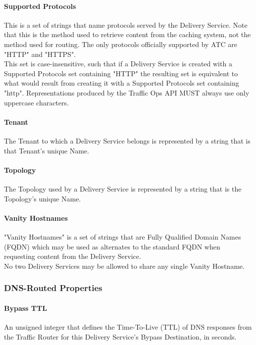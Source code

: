\paragraph{Supported Protocols}
This is a set of strings that name protocols served by the Delivery Service.
Note that this is the method used to retrieve content from the caching system,
not the method used for routing. The only protocols officially supported by ATC
are "HTTP" and "HTTPS".\\
This set is case-insensitive, such that if a Delivery Service is created with a
Supported Protocols set containing "HTTP" the resulting set is equivalent to
what would result from creating it with a Supported Protocols set containing
"http". Representations produced by the Traffic Ops API MUST always use
only uppercase characters.

\paragraph{Tenant}
The Tenant to which a Delivery Service belongs is represented by a string that
is that Tenant's unique Name.

\paragraph{Topology}
The Topology used by a Delivery Service is represented by a string that is the
Topology's unique Name.

\paragraph{Vanity Hostnames}
"Vanity Hostnames" is a set of strings that are Fully Qualified Domain Names
(FQDN) which may be used as alternates to the standard
 FQDN when requesting
content from the Delivery Service.\\
No two Delivery Services may be allowed to share any single Vanity Hostname.

\subsubsection{DNS-Routed Properties}

\paragraph{Bypass TTL}
An unsigned integer that defines the Time-To-Live (TTL) of DNS responses from
the Traffic Router for this Delivery Service's Bypass Destination, in seconds.

